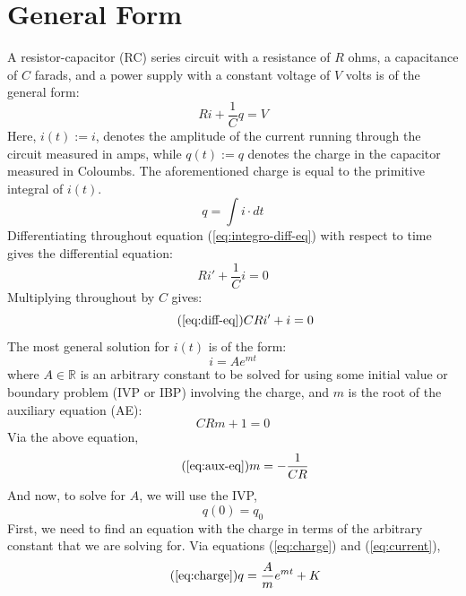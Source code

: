 \documentclass{article}
\begin{document}
	\section[General]{General Form}
	A resistor-capacitor (RC) series circuit with a resistance of $R$ ohms, a 
	capacitance of $C$ farads, 
	and a power supply with a constant voltage of $V$ volts is of the general 
	form:
	\begin{equation}\label{eq:integro-diff-eq}
		Ri + \frac{1}{C}q = V
	\end{equation}
	Here, $i(t):=i$, denotes the amplitude of the current running through the 
	circuit measured in amps, while $q(t):=q$ denotes the charge in the 
	capacitor measured in Coloumbs.  The aforementioned charge is equal to the 
	primitive integral of $i(t)$.
	\begin{equation}\label{eq:charge}
		q = \int i \cdot dt
	\end{equation}
	Differentiating throughout equation (\ref{eq:integro-diff-eq}) with respect 
	to time gives the differential equation:
	\begin{equation}\label{eq:diff-eq}
		Ri' + \frac{1}{C}i = 0
	\end{equation}
	Multiplying throughout by $C$ gives:
	\begin{equation}\tag{\ref{eq:diff-eq}}
		CRi' + i = 0
	\end{equation}
	The most general solution for $i(t)$ is of the form:
	\begin{equation}\label{eq:current}
		i = Ae^{mt}
	\end{equation}
	where $A \in \mathbb{R}$ is an arbitrary constant to be solved for using 
	some initial value or boundary problem (IVP or IBP) involving the charge, 
	and $m$ is the root of the auxiliary equation (AE):
	\begin{equation}\label{eq:aux-eq}
		CRm + 1 = 0
	\end{equation}
	Via the above equation,
	\begin{equation}\tag{\ref{eq:aux-eq}}
		m = -\frac{1}{CR}
	\end{equation}
	And now, to solve for $A$, we will use the IVP,
	\begin{equation}\label{eq:ivp}
		q(0) = q_0
	\end{equation}
	First, we need to find an equation with the charge in terms of the 
	arbitrary constant that we are solving for.  Via equations 
	(\ref{eq:charge}) and (\ref{eq:current}),
	\begin{equation}\tag{\ref{eq:charge}}
		q = \frac{A}{m}e^{mt} + K	
	\end{equation}
\end{document}
